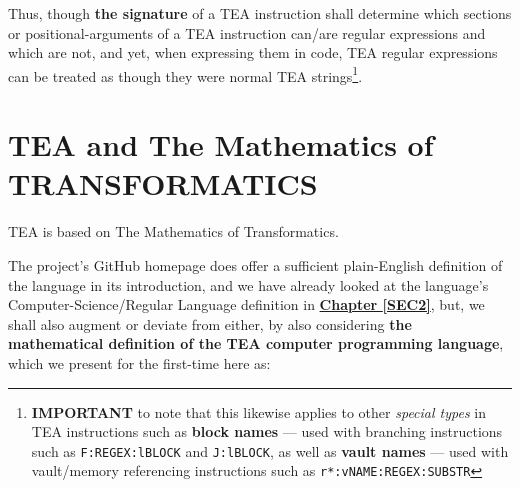 \documentclass[a4paper, 18pt]{book} %
\begin{document}
Thus, though \textbf{the signature} of a TEA instruction shall determine which sections or positional-arguments of a TEA instruction can/are regular expressions and which are not, and yet, when expressing them in code, TEA regular expressions can be treated as though they were normal TEA strings\footnote{\textbf{IMPORTANT} to note that this likewise applies to other \textit{special types} in TEA instructions such as \textbf{block names} --- used with branching instructions such as \texttt{F:REGEX:lBLOCK} and \texttt{J:lBLOCK}, as well as \textbf{vault names} --- used with vault/memory referencing instructions such as \texttt{r*:vNAME:REGEX:SUBSTR}}.





\chapter{TEA and The Mathematics of TRANSFORMATICS}
\label{SECTRANSFORM}


TEA is based on The Mathematics of Transformatics\cite{Lutalo2025_transformatics_thesis}. 

\vspace{1em}



The project's GitHub homepage\cite{cli_tttt} does offer a sufficient plain-English definition of the language in its introduction, and we have already looked at the language's Computer-Science/Regular Language definition in \textbf{\hyperref[SEC2]{Chapter \ref{SEC2}}}, but, we shall also augment or deviate from either, by also considering \textbf{the mathematical definition of the TEA computer programming language}, which we present for the first-time here as:\\
\end{document}
